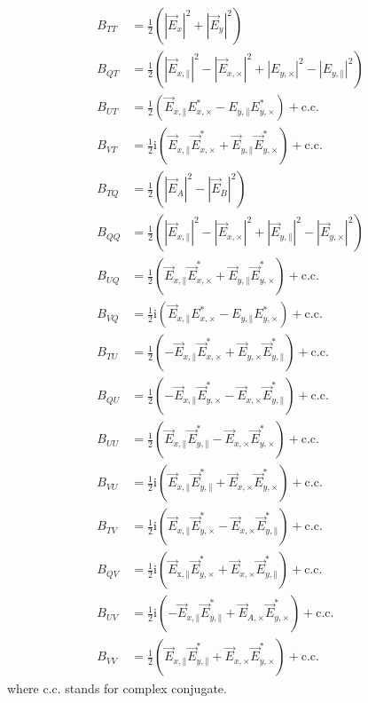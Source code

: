 \documentclass[a4paper,fleqn]{cas-dc}\sloppy
\newcommand{\co}{\mathbin{\|}}
\newcommand{\cx}{\mathbin{\times}}
\begin{document}
	\begin{equation}
	\begin{split}
	B_{TT}&=\frac{1}{2}\left(\left|\vec{E}_{x}\right|^{2}+\left|\vec{E}_{y}\right|^{2}\right)\\
	B_{QT}&=\frac{1}{2}\left(\left|\vec{E}_{x,\co}\right|^{2}-\left|\vec{E}_{x,\cx}\right|^{2} +  \left|E_{y,\cx}\right|^{2}-\left|E_{y,\co}\right|^{2}\right)\\
	B_{UT}&=\frac{1}{2}\left(\vec{E}_{x,\co} E_{x,\cx}^{*} - E_{y,\co} E_{y,\cx}^{*}\right) + \mathrm{c.c.}\\
	B_{VT}&=\frac{1}{2}\mathrm{i}\left(\vec{E}_{x,\co}\vec{E}_{x,\cx}^{*} + \vec{E}_{y,\co} \vec{E}_{y,\cx}^{*}\right) + \mathrm{c.c.}\\
	B_{TQ}&=\frac{1}{2}\left(\left|\vec{E}_{A}\right|^{2}-\left|\vec{E}_{B}\right|^{2}\right)\\
	B_{QQ}&=\frac{1}{2}\left(\left|\vec{E}_{x,\co}\right|^{2}-\left|\vec{E}_{x,\cx}\right|^{2}+\left|\vec{E}_{y,\co}\right|^{2}-\left|\vec{E}_{y,\cx}\right|^{2}\right)\\
	B_{UQ}&=\frac{1}{2}\left(\vec{E}_{x,\co} \vec{E}_{x,\cx}^{*} + \vec{E}_{y,\co} \vec{E}_{y,\cx}^{*}\right)+\mathrm{c.c.}\\
	B_{VQ}&=\frac{1}{2}\mathrm{i}\left( \vec{E}_{x,\co} E_{x,\cx}^{*} - E_{y,\co} E_{y,\cx}^{*}\right)+\mathrm{c.c.}\\
	B_{TU}&=\frac{1}{2}\left( -\vec{E}_{x,\co} \vec{E}_{x,\cx}^{*} + \vec{E}_{y,\cx} \vec{E}_{y,\co}^{*}\right)+\mathrm{c.c.}\\
	B_{QU}&=\frac{1}{2}\left(-\vec{E}_{x,\co}\vec{E}_{y,\cx}^{*} - \vec{E}_{x,\cx} \vec{E}_{y,\co}^{*}\right)+\mathrm{c.c.}\\
	B_{UU}&=\frac{1}{2}\left(\vec{E}_{x,\co} \vec{E}_{y,\co}^{*} - \vec{E}_{x,\cx} \vec{E}_{y,\cx}^{*}\right)+\mathrm{c.c.}\\
	B_{VU}&=\frac{1}{2}\mathrm{i}\left(\vec{E}_{x,\co} \vec{E}_{y,\co}^{*} + \vec{E}_{x,\cx}\vec{E}_{y,\cx}^{*}\right)+\mathrm{c.c.}\\
	B_{TV}&=\frac{1}{2}\mathrm{i}\left(\vec{E}_{x,\co} \vec{E}_{y,\cx}^{*} - \vec{E}_{x,\cx}\vec{E}_{y,\co}^{*}\right)+\mathrm{c.c.}\\
	B_{QV}&=\frac{1}{2}\mathrm{i}\left(\vec{E}_{\mathrm{x,\co}} \vec{E}_{y,\cx}^{*} + \vec{E}_{x,\cx} \vec{E}_{y,\co}^{*}\right)+\mathrm{c.c.}\\
	B_{UV}&=\frac{1}{2}\mathrm{i}\left(-\vec{E}_{x,\co} \vec{E}_{y,\co}^{*} + \vec{E}_{A,\cx} \vec{E}_{y,\cx}^{*}\right)+\mathrm{c.c.}\\
	B_{VV}&=\frac{1}{2}\left(\vec{E}_{x,\co} \vec{E}_{y,\co}^{*} + \vec{E}_{x,\cx} \vec{E}_{y,\cx}^{*}\right)+\mathrm{c.c.}
	\end{split}
	\end{equation}
	\noindent
	where c.c. stands for complex conjugate.
	
\end{document}
